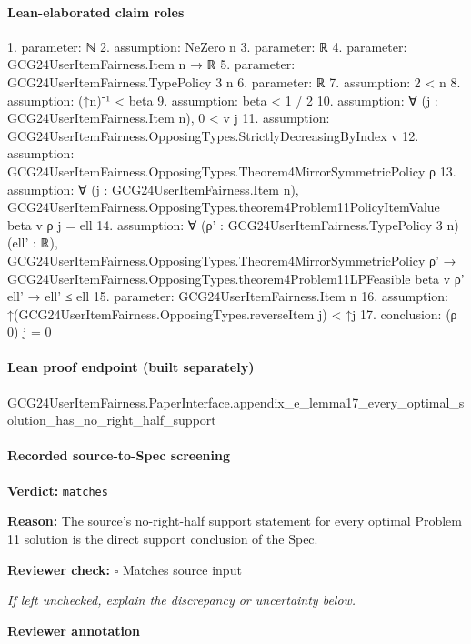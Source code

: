 \documentclass[10pt]{article}
\newcommand{\reviewerbox}{%
  \par\noindent\fbox{\parbox{0.96\linewidth}{\rule{0pt}{0.38in}}}\par
}
\newcommand{\reviewmatch}[1]{%
  \par\noindent\textbf{Reviewer check:} $\square$\; #1\par
  \noindent\emph{If left unchecked, explain the discrepancy or uncertainty below.}\par
}
\begin{document}
\paragraph{Lean-elaborated claim roles}\begin{ReviewVerbatim}
1. parameter: ℕ
2. assumption: NeZero n
3. parameter: ℝ
4. parameter: GCG24UserItemFairness.Item n → ℝ
5. parameter: GCG24UserItemFairness.TypePolicy 3 n
6. parameter: ℝ
7. assumption: 2 < n
8. assumption: (↑n)⁻¹ < beta
9. assumption: beta < 1 / 2
10. assumption: ∀ (j : GCG24UserItemFairness.Item n), 0 < v j
11. assumption: GCG24UserItemFairness.OpposingTypes.StrictlyDecreasingByIndex v
12. assumption: GCG24UserItemFairness.OpposingTypes.Theorem4MirrorSymmetricPolicy ρ
13. assumption: ∀ (j : GCG24UserItemFairness.Item n),
  GCG24UserItemFairness.OpposingTypes.theorem4Problem11PolicyItemValue beta v ρ j = ell
14. assumption: ∀ (ρ' : GCG24UserItemFairness.TypePolicy 3 n) (ell' : ℝ),
  GCG24UserItemFairness.OpposingTypes.Theorem4MirrorSymmetricPolicy ρ' →
    GCG24UserItemFairness.OpposingTypes.theorem4Problem11LPFeasible beta v ρ' ell' → ell' ≤ ell
15. parameter: GCG24UserItemFairness.Item n
16. assumption: ↑(GCG24UserItemFairness.OpposingTypes.reverseItem j) < ↑j
17. conclusion: (ρ 0) j = 0
\end{ReviewVerbatim}

\paragraph{Lean proof endpoint (built separately)}\begin{ReviewVerbatim}
GCG24UserItemFairness.PaperInterface.appendix_e_lemma17_every_optimal_solution_has_no_right_half_support
\end{ReviewVerbatim}

\paragraph{Recorded source-to-Spec screening}
\textbf{Verdict:} \texttt{matches}
\\
{\raggedright
\textbf{Reason:} The source's no-\allowbreak{}right-\allowbreak{}half support statement for every optimal Problem 11 solution is the direct support conclusion of the Spec.\allowbreak{}
\par}
\reviewmatch{Matches source input}
\noindent\textbf{Reviewer annotation}\par
\reviewerbox
\clearpage
\hypertarget{source-claim-b8bc7fe7622f9901}{}
\hypertarget{source-section-c08c7eca66416a2f}{}
\end{document}
